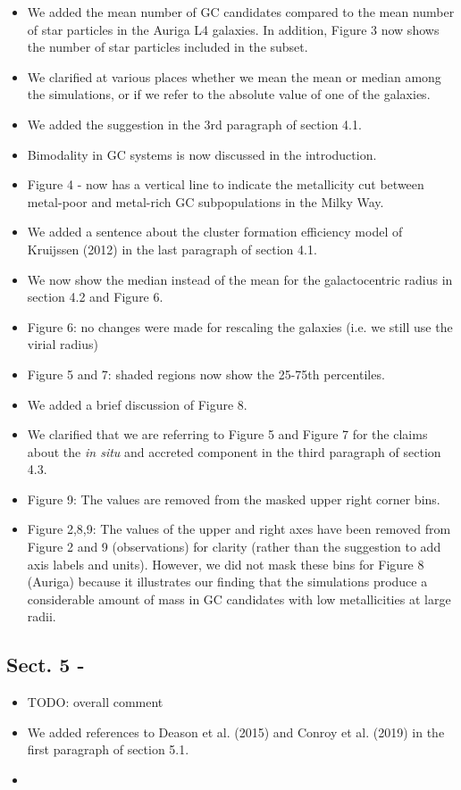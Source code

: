 \documentclass{article}
\begin{document}
\begin{itemize}
\item We added the mean number of GC candidates compared to the mean number of
star particles in the Auriga L4 galaxies. In addition, Figure 3 now shows the 
number of star particles included in the subset.
\item We clarified at various places whether we mean the mean or median among
the simulations, or if we refer to the absolute value of one of the galaxies.
\item We added the suggestion in the 3rd paragraph of section 4.1.
\item Bimodality in GC systems is now discussed in the introduction.
\item Figure 4 - now has a vertical line to indicate the metallicity cut 
between metal-poor and metal-rich GC subpopulations in the Milky Way.
\item We added a sentence about the cluster formation efficiency model of 
Kruijssen (2012) in the last paragraph of section 4.1.
\item We now show the median instead of the mean for the galactocentric radius in
section 4.2 and Figure 6.
\item Figure 6: no changes were made for rescaling the galaxies (i.e. we still
use the virial radius)
\item Figure 5 and 7: shaded regions now show the 25-75th percentiles.
\item We added a brief discussion of Figure 8.
\item We clarified that we are referring to Figure 5 and Figure 7 for the claims about
the {\it in situ} and accreted component in the third paragraph of section 4.3.
\item Figure 9: The values are removed from the masked upper right corner bins.
\item Figure 2,8,9: The values of the upper and right axes have been removed from
Figure 2 and 9 (observations) for clarity (rather than the suggestion to add 
axis labels and units). However, we did not mask these bins for Figure 8 (Auriga)
because it illustrates our finding that the simulations produce a considerable
amount of mass in GC candidates with low metallicities at large radii.
\end{itemize}

\subsection*{Sect. 5 -}
\begin{itemize}
\item TODO: overall comment
\item We added references to Deason et al. (2015) and Conroy et al. (2019) in
the first paragraph of section 5.1.
\item
\end{itemize}
\end{document}
